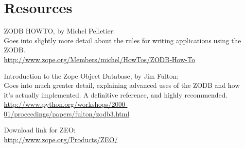 
\section{Resources}

ZODB HOWTO, by Michel Pelletier:
\\
Goes into slightly more detail about the rules for writing applications using the ZODB.
\\
\url{http://www.zope.org/Members/michel/HowTos/ZODB-How-To}


Introduction to the Zope Object Database, by Jim Fulton:
\\
Goes into much greater detail, explaining advanced uses of the ZODB and 
how it's actually implemented.  A definitive reference, and highly recommended.
\\
\url{http://www.python.org/workshops/2000-01/proceedings/papers/fulton/zodb3.html}

Download link for ZEO: \\
\url{http://www.zope.org/Products/ZEO/}


